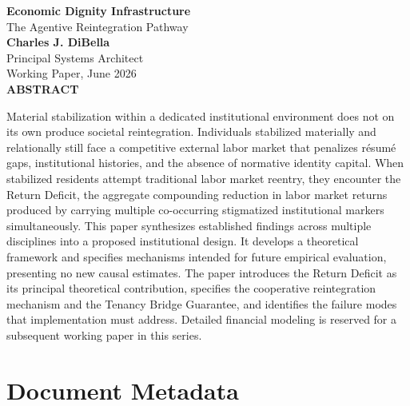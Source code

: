 \documentclass[12pt, letterpaper]{article}
\begin{document}
\captionsetup[table]{labelfont=normalfont, labelsep=period, skip=6pt}

\begin{titlepage}
\begin{center}
{\LARGE \textbf{Economic Dignity Infrastructure}}\\[6pt]
{\large The Agentive Reintegration Pathway}\\[0.5cm]
{\normalsize \textbf{Charles J. DiBella}}\\[0.01cm]
{\normalsize Principal Systems Architect}\\[0.01cm]
{\normalsize Working Paper, June 2026}\\[0.3cm]
\textbf{ABSTRACT}
\vspace{0.2cm}
\end{center}
\begin{minipage}{0.95\textwidth}
\noindent

Material stabilization within a dedicated institutional environment does not on its own produce societal reintegration. Individuals stabilized materially and relationally still face a competitive external labor market that penalizes r\'{e}sum\'{e} gaps, institutional histories, and the absence of normative identity capital. When stabilized residents attempt traditional labor market reentry, they encounter the Return Deficit, the aggregate compounding reduction in labor market returns produced by carrying multiple co-occurring stigmatized institutional markers simultaneously. This paper synthesizes established findings across multiple disciplines into a proposed institutional design. It develops a theoretical framework and specifies mechanisms intended for future empirical evaluation, presenting no new causal estimates. The paper introduces the Return Deficit as its principal theoretical contribution, specifies the cooperative reintegration mechanism and the Tenancy Bridge Guarantee, and identifies the failure modes that implementation must address. Detailed financial modeling is reserved for a subsequent working paper in this series.

\end{minipage}
\end{titlepage}


\newpage
\section*{Document Metadata}
\end{document}
